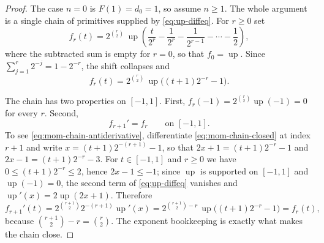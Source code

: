 \documentclass[11pt,oneside]{article}
\theoremstyle{definition}
\theoremstyle{remark}
\newcommand{\Up}{\operatorname{up}}
\begin{document}
\begin{proof}
The case $n=0$ is $F(1)=d_0=1$, so assume $n\ge1$.  The whole argument is a single chain of
primitives supplied by \eqref{eq:up-diffeq}.  For $r\ge0$ set
\begin{equation}
 f_r(t)=2^{\binom r2}\,\Up\!\left(\frac{t}{2^r}-\frac1{2^r}-\frac1{2^{r-1}}
 -\cdots-\frac12\right),                                   \label{eq:mom-primitive-chain}
\end{equation}
where the subtracted sum is empty for $r=0$, so that $f_0=\Up$.  Since
$\sum_{j=1}^{r}2^{-j}=1-2^{-r}$, the shift collapses and
\begin{equation}
 f_r(t)=2^{\binom r2}\,\Up\bigl((t+1)2^{-r}-1\bigr).        \label{eq:mom-chain-closed}
\end{equation}

The chain has two properties on $[-1,1]$.  First, $f_r(-1)=2^{\binom r2}\Up(-1)=0$ for every
$r$.  Second,
\begin{equation}
 f_{r+1}'=f_r\qquad\text{on }[-1,1].                        \label{eq:mom-chain-antiderivative}
\end{equation}
To see \eqref{eq:mom-chain-antiderivative}, differentiate \eqref{eq:mom-chain-closed} at
index $r+1$ and write $x=(t+1)2^{-(r+1)}-1$, so that $2x+1=(t+1)2^{-r}-1$ and
$2x-1=(t+1)2^{-r}-3$.  For $t\in[-1,1]$ and $r\ge0$ we have
$0\le(t+1)2^{-r}\le2$, hence $2x-1\le-1$; since $\Up$ is supported on $[-1,1]$ and
$\Up(-1)=0$, the second term of \eqref{eq:up-diffeq} vanishes and
$\Up'(x)=2\Up(2x+1)$.  Therefore
\begin{equation*}
 f_{r+1}'(t)=2^{\binom{r+1}{2}}2^{-(r+1)}\Up'(x)
 =2^{\binom{r+1}{2}-r}\,\Up\bigl((t+1)2^{-r}-1\bigr)
 =f_r(t),
\end{equation*}
because $\binom{r+1}{2}-r=\binom r2$.  The exponent bookkeeping is exactly what makes the
chain close.


\end{proof}
\end{document}
